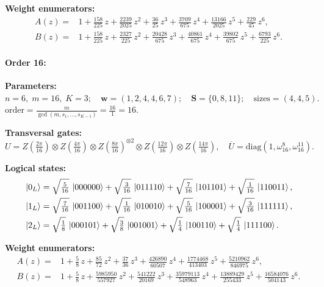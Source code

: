 \documentclass[pdflatex,sn-nature]{sn-jnl}%
\theoremstyle{thmstyleone}%
\theoremstyle{thmstyletwo}%
\theoremstyle{thmstylethree}%
\begin{document}
\begin{appendices}
\noindent\textbf{Weight enumerators:}
\begin{align*}
    A(z) = &1 + \tfrac{158}{225}\,z + \tfrac{2239}{2025}\,z^{2} + \tfrac{36}{25}\,z^{3} + \tfrac{3709}{675}\,z^{4} + \tfrac{13166}{2025}\,z^{5} + \tfrac{229}{45}\,z^{6}, \\
    B(z) = &1 + \tfrac{158}{225}\,z + \tfrac{2327}{225}\,z^{2} + \tfrac{20428}{675}\,z^{3} + \tfrac{40861}{675}\,z^{4} + \tfrac{39802}{675}\,z^{5} + \tfrac{6793}{225}\,z^{6}.
\end{align*}

\paragraph{\textbf{Order 16:}}
\noindent\textbf{Parameters:} $n=6,\; m=16,\; K=3;\quad \mathbf w=(1, 2, 4, 4, 6, 7);\quad \mathbf S=\{0, 8, 11\};\quad \text{sizes}=\left(4, 4, 5\right).$ $\displaystyle \text{order}=\frac{m}{\gcd(m,s_1,\dots,s_{K-1})}=\frac{16}{1}=16.$

\noindent\textbf{Transversal gates:}
\[
    U=Z \left(\tfrac{2\pi}{16}\right) \otimes Z \left(\tfrac{4\pi}{16}\right) \otimes Z \left(\tfrac{8\pi}{16}\right)^{\otimes2} \otimes Z \left(\tfrac{12\pi}{16}\right) \otimes Z \left(\tfrac{14\pi}{16}\right),\quad
    \overline U=\mathrm{diag}(1,\omega_{16}^{8},\omega_{16}^{11}).
\]

\noindent\textbf{Logical states:}
\begin{align*}
   &\ket{0_L} = \sqrt{\tfrac{5}{16}}\,\ket{000000} + \sqrt{\tfrac{3}{16}}\,\ket{011110} + \sqrt{\tfrac{7}{16}}\,\ket{101101} + \sqrt{\tfrac{1}{16}}\,\ket{110011}, \\
   &\ket{1_L} = \sqrt{\tfrac{7}{16}}\,\ket{001100} + \sqrt{\tfrac{1}{16}}\,\ket{010010} + \sqrt{\tfrac{5}{16}}\,\ket{100001} + \sqrt{\tfrac{3}{16}}\,\ket{111111}, \\
   &\ket{2_L} = \sqrt{\tfrac{1}{8}}\,\ket{000101} + \sqrt{\tfrac{3}{8}}\,\ket{001001} + \sqrt{\tfrac{1}{4}}\,\ket{100110} + \sqrt{\tfrac{1}{4}}\,\ket{111100}. 
\end{align*}

\noindent\textbf{Weight enumerators:}
\begin{align*}
    A(z) = &1 + \tfrac{5}{8}\,z + \tfrac{85}{72}\,z^{2} + \tfrac{37}{36}\,z^{3} + \tfrac{426890}{60507}\,z^{4} + \tfrac{1774468}{413403}\,z^{5} + \tfrac{5210962}{846975}\,z^{6}, \\
    B(z) = &1 + \tfrac{5}{8}\,z + \tfrac{5985950}{557927}\,z^{2} + \tfrac{541222}{20169}\,z^{3} + \tfrac{35979113}{548963}\,z^{4} + \tfrac{13889429}{255433}\,z^{5} + \tfrac{16584076}{504143}\,z^{6}. 
\end{align*}


\end{appendices}
\end{document}

